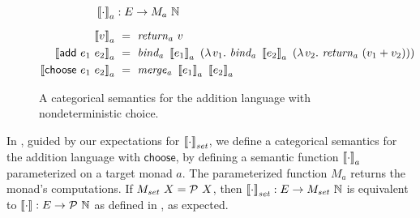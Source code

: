 {\begin{figure}[tb]\centering
\begin{varwidth}[b]{\textwidth}
\begin{equation*}
\begin{aligned}
	\meaningof{\cdot}_a &: E \to M_a~\Nat
\\[6pt]
	\meaningof{v}_a&\ =\ \mathit{return_a}~v
\\
	\meaningof{\mathsf{add}~e_1~e_2}_a&\ =\ \mathit{bind_a}~\meaningof{e_1}_a~(\fun{v_1} \mathit{bind_a}~\meaningof{e_2}_a~(\fun{v_2} \mathit{return_a}~(v_1 + v_2)))
\\
	\meaningof{\mathsf{choose}~e_1~e_2}_a&\ =\ \mathit{merge_a}~\meaningof{e_1}_a~\meaningof{e_2}_a
\end{aligned}
\end{equation*}
\end{varwidth}
\bottomhrule
\caption[Categorical semantics with nondeterminism]{A categorical semantics for the addition language with nondeterministic choice.}
\label{fig:add-choose-categorical}
\end{figure}

In , guided by our expectations for $\left\llbracket{\cdot}\right\rrbracket_\mathit{set}$, we define a categorical semantics for the addition language with $\mathsf{choose}$, by defining a semantic function $\left\llbracket{\cdot}\right\rrbracket_a$ parameterized on a target monad $a$.
The parameterized function $M_a$ returns the monad's computations.
If $M_\mathit{set}~X = \mathcal{P}~X$, then $\left\llbracket{\cdot}\right\rrbracket_\mathit{set} : E \to M_\mathit{set}~\mathbb{N}$ is equivalent to $\left\llbracket{\cdot}\right\rrbracket : E \to \mathcal{P}~\mathbb{N}$ as defined in , as expected.

}
